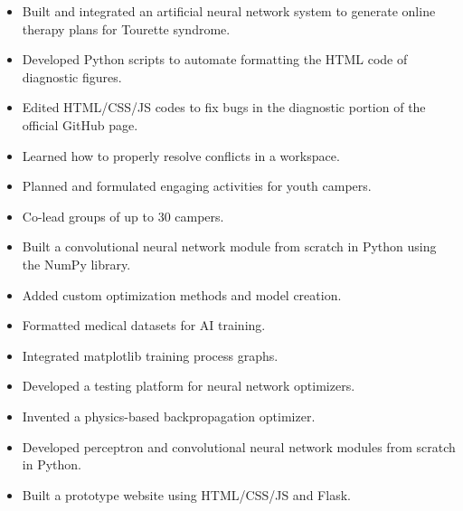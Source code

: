 \documentclass[10pt,a4paper,ragged2e,withhyper]{altacv}
\begin{document}
\begin{paracol}{2}


\begin{itemize}
\item Built and integrated an artificial neural network system to \newline generate online therapy plans for Tourette syndrome.
\item Developed Python scripts to automate formatting the HTML code of diagnostic figures.
\item Edited HTML/CSS/JS codes to fix bugs in the diagnostic portion of the official GitHub page.
\end{itemize}

\divider

\begin{itemize}
\item Learned how to properly resolve conflicts in a workspace. 
\item Planned and formulated engaging activities for youth campers.
\item Co-lead groups of up to 30 campers.
\end{itemize}


\begin{itemize}
\item Built a convolutional neural network module from scratch in Python using the NumPy library.
\item Added custom optimization methods and model creation.
\item Formatted medical datasets for AI training.
\item Integrated matplotlib training process graphs.
\end{itemize}

\divider

\begin{itemize}
\item Developed a testing platform for neural network optimizers.
\item Invented a physics-based backpropagation optimizer.
\item Developed perceptron and convolutional neural network \newline modules from scratch in Python.
\item Built a prototype website using HTML/CSS/JS and Flask.
\end{itemize}


\end{paracol}
\end{document}
